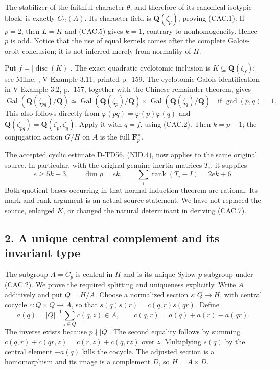 The stabilizer of the faithful character \(\theta\), and therefore
of its canonical isotypic block, is exactly \(C_G(A)\).
Its character field is \(\mathbf Q(\zeta_p)\), proving (CAC.1).
If \(p=2\), then \(L=K\) and (CAC.5) gives \(k=1\), contrary
to nonhomogeneity. Hence \(p\) is odd.
Notice that the use of equal kernels comes after the complete
Galois-orbit conclusion; it is not inferred merely from normality
of \(H\).

Put \(f=|\operatorname{disc}(K)|\). The exact quadratic
cyclotomic inclusion is \(K\subseteq\mathbf Q(\zeta_f)\);
see Milne, \cite{HD:MilneCFT2020}, V Example 3.11, printed p.~159.
The cyclotomic Galois identification in V Example 3.2, p.~157,
together with the Chinese remainder theorem, gives
\[
 \operatorname{Gal}(\mathbf Q(\zeta_{pq})/\mathbf Q)
 \simeq
 \operatorname{Gal}(\mathbf Q(\zeta_p)/\mathbf Q)
 \times\operatorname{Gal}(\mathbf Q(\zeta_q)/\mathbf Q)
 \quad\text{if }\gcd(p,q)=1.
 \tag{CAC.6}
\]
This also follows directly from
\(\varphi(pq)=\varphi(p)\varphi(q)\) and
\(\mathbf Q(\zeta_{pq})=\mathbf Q(\zeta_p,\zeta_q)\).
Apply it with \(q=f\), using (CAC.2). Then \(k=p-1\);
the conjugation action \(G/H\) on \(A\) is the full
\(\mathbf F_p^\times\).

The accepted cyclic estimate D-TD56, (NID.4), now applies to the
same original source. In particular, with the original genuine
inertia matrices \(T_i\), it supplies
\[
 e\ge5k-3,\qquad
 \dim\rho=ek,\qquad
 \sum_i\operatorname{rank}(T_i-I)=2ek+6.
 \tag{CAC.7}
\]
Both quotient bases occurring in that normal-induction theorem
are rational. Its mark and rank argument is an actual-source
statement. We have not replaced the source, enlarged \(K\), or
changed the natural determinant in deriving (CAC.7).

\subsection*{2. A unique central complement and its invariant type}

The subgroup \(A=C_p\) is central in \(H\) and is its unique
Sylow \(p\)-subgroup under (CAC.2). We prove the required splitting
and uniqueness explicitly. Write \(A\) additively and put \(Q=H/A\).
Choose a normalized section \(s:Q\to H\), with central cocycle
\(c:Q\times Q\to A\), so that
\(s(q)s(r)=c(q,r)s(qr)\). Define
\[
 a(q)=|Q|^{-1}\sum_{z\in Q}c(q,z)\in A,\qquad
 c(q,r)=a(q)+a(r)-a(qr).
 \tag{CAC.8}
\]
The inverse exists because \(p\nmid|Q|\). The second equality
follows by summing
\(c(q,r)+c(qr,z)=c(r,z)+c(q,rz)\) over \(z\).
Multiplying \(s(q)\) by the central element \(-a(q)\) kills the
cocycle. The adjusted section is a homomorphism and its image is
a complement \(D\), so \(H=A\times D\).

